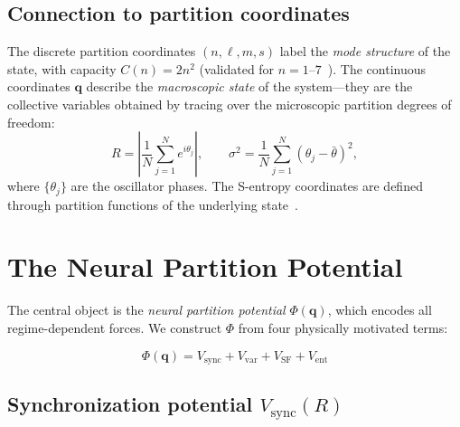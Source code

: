 \documentclass[twocolumn,aps,prl,superscriptaddress,floatfix]{revtex4-2}
\newcommand{\Pot}{\Phi}
\newcommand{\qvec}{\mathbf{q}}
\begin{document}
\subsection{Connection to partition coordinates}

The discrete partition coordinates $(n, \ell, m, s)$ label the \emph{mode structure} of the state, with capacity $C(n) = 2n^2$ (validated for $n = 1$--$7$~\cite{sachikonye2026operator}).
The continuous coordinates $\qvec$ describe the \emph{macroscopic state} of the system---they are the collective variables obtained by tracing over the microscopic partition degrees of freedom:
\begin{equation}
R = \left|\frac{1}{N}\sum_{j=1}^{N} e^{i\theta_j}\right|, \qquad
\sigma^2 = \frac{1}{N}\sum_{j=1}^{N}(\theta_j - \bar{\theta})^2,
\end{equation}
where $\{\theta_j\}$ are the oscillator phases.
The S-entropy coordinates are defined through partition functions of the underlying state~\cite{sachikonye2026operator}.


\section{The Neural Partition Potential}
\label{sec:potential}

The central object is the \emph{neural partition potential} $\Pot(\qvec)$, which encodes all regime-dependent forces.
We construct $\Pot$ from four physically motivated terms:

\begin{equation}
\boxed{
\Pot(\qvec) = V_{\mathrm{sync}} + V_{\mathrm{var}} + V_{\mathrm{SF}} + V_{\mathrm{ent}}
}
\label{eq:potential}
\end{equation}

\subsection{Synchronization potential $V_{\mathrm{sync}}(R)$}
\label{sec:vsync}
\end{document}
